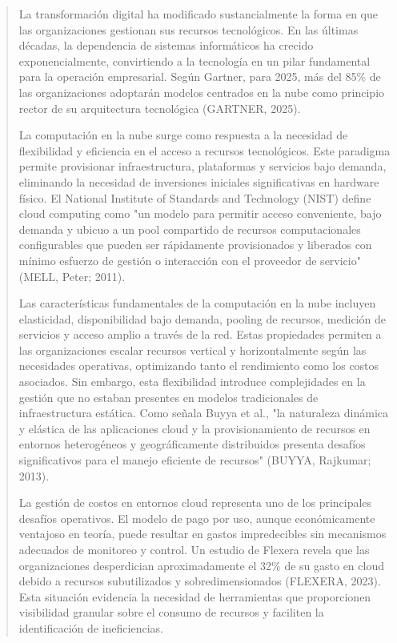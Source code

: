 \documentclass[
]{article}
\begin{document}
\begin{quote}
La transformación digital ha modificado sustancialmente la forma en que
las organizaciones gestionan sus recursos tecnológicos. En las últimas
décadas, la dependencia de sistemas informáticos ha crecido
exponencialmente, convirtiendo a la tecnología en un pilar fundamental
para la operación empresarial. Según Gartner, para 2025, más del 85\% de
las organizaciones adoptarán modelos centrados en la nube como principio
rector de su arquitectura tecnológica (GARTNER, 2025).

La computación en la nube surge como respuesta a la necesidad de
flexibilidad y eficiencia en el acceso a recursos tecnológicos. Este
paradigma permite provisionar infraestructura, plataformas y servicios
bajo demanda, eliminando la necesidad de inversiones iniciales
significativas en hardware físico. El National Institute of Standards
and Technology (NIST) define cloud computing como "un modelo para
permitir acceso conveniente, bajo demanda y ubicuo a un pool compartido
de recursos computacionales configurables que pueden ser rápidamente
provisionados y liberados con mínimo esfuerzo de gestión o interacción
con el proveedor de servicio" (MELL, Peter; 2011).

Las características fundamentales de la computación en la nube incluyen
elasticidad, disponibilidad bajo demanda, pooling de recursos, medición
de servicios y acceso amplio a través de la red. Estas propiedades
permiten a las organizaciones escalar recursos vertical y
horizontalmente según las necesidades operativas, optimizando tanto el
rendimiento como los costos asociados. Sin embargo, esta flexibilidad
introduce complejidades en la gestión que no estaban presentes en
modelos tradicionales de infraestructura estática. Como señala Buyya et
al., "la naturaleza dinámica y elástica de las aplicaciones cloud y la
provisionamiento de recursos en entornos heterogéneos y geográficamente
distribuidos presenta desafíos significativos para el manejo eficiente
de recursos" (BUYYA, Rajkumar; 2013).

La gestión de costos en entornos cloud representa uno de los principales
desafíos operativos. El modelo de pago por uso, aunque económicamente
ventajoso en teoría, puede resultar en gastos impredecibles sin
mecanismos adecuados de monitoreo y control. Un estudio de Flexera
revela que las organizaciones desperdician aproximadamente el 32\% de su
gasto en cloud debido a recursos subutilizados y sobredimensionados
(FLEXERA, 2023). Esta situación evidencia la necesidad de herramientas
que proporcionen visibilidad granular sobre el consumo de recursos y
faciliten la identificación de ineficiencias.


\end{quote}
\end{document}
